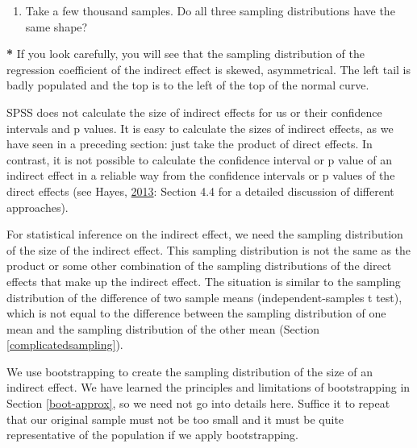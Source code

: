 \documentclass[a4paper]{book}
\newenvironment{Shaded}{\begin{snugshade}}{\end{snugshade}}
\newcommand{\StringTok}[1]{\textcolor[rgb]{0.00,0.00,0.00}{#1}}
\newcommand{\OperatorTok}[1]{\textcolor[rgb]{0.00,0.00,0.00}{\textbf{#1}}}
\newcommand{\NormalTok}[1]{#1}
\providecommand{\tightlist}{%
  \setlength{\itemsep}{0pt}\setlength{\parskip}{0pt}}
\theoremstyle{definition}
\theoremstyle{definition}
\theoremstyle{definition}
\theoremstyle{remark}
\begin{document}
\begin{enumerate}
\def\labelenumi{\arabic{enumi}.}
\setcounter{enumi}{1}
\tightlist
\item
  Take a few thousand samples. Do all three sampling distributions have
  the same shape?
\end{enumerate}

\begin{Shaded}
\begin{Highlighting}[]
\OperatorTok{*}\StringTok{ }\NormalTok{If you look carefully, you will see that the sampling distribution of the}
\NormalTok{regression coefficient of the indirect effect is skewed, asymmetrical. The}
\NormalTok{left tail is badly populated and the top is to the left of the top of}
\NormalTok{the normal curve.}
\end{Highlighting}
\end{Shaded}

SPSS does not calculate the size of indirect effects for us or their
confidence intervals and p values. It is easy to calculate the sizes of
indirect effects, as we have seen in a preceding section: just take the
product of direct effects. In contrast, it is not possible to calculate
the confidence interval or p value of an indirect effect in a reliable
way from the confidence intervals or p values of the direct effects (see
Hayes, \protect\hyperlink{ref-RefWorks:3873}{2013}: Section 4.4 for a
detailed discussion of different approaches).

For statistical inference on the indirect effect, we need the sampling
distribution of the size of the indirect effect. This sampling
distribution is not the same as the product or some other combination of
the sampling distributions of the direct effects that make up the
indirect effect. The situation is similar to the sampling distribution
of the difference of two sample means (independent-samples t test),
which is not equal to the difference between the sampling distribution
of one mean and the sampling distribution of the other mean (Section
\ref{complicatedsampling}).

We use bootstrapping to create the sampling distribution of the size of
an indirect effect. We have learned the principles and limitations of
bootstrapping in Section \ref{boot-approx}, so we need not go into
details here. Suffice it to repeat that our original sample must not be
too small and it must be quite representative of the population if we
apply bootstrapping.
\end{document}
